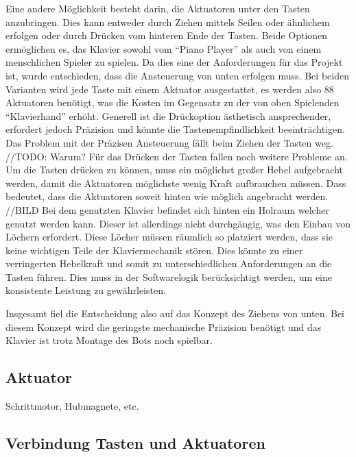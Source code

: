 Eine andere Möglichkeit besteht darin, die Aktuatoren unter den Tasten anzubringen. Dies kann entweder durch Ziehen mittels
Seilen oder ähnlichem erfolgen oder durch Drücken vom hinteren Ende der Tasten. Beide Optionen ermöglichen es, das Klavier sowohl vom
``Piano Player'' als auch von einem menschlichen Spieler zu spielen. Da dies eine der Anforderungen für das Projekt ist,
wurde entschieden, dass die Ansteuerung von unten erfolgen muss. Bei beiden Varianten wird jede Taste mit einem Aktuator
ausgestattet, es werden also 88 Aktuatoren benötigt, was die Kosten im Gegensatz zu der von oben Spielenden ``Klavierhand''
erhöht.
Generell ist die Drückoption ästhetisch ansprechender, erfordert jedoch Präzision und könnte die
Tastenempfindlichkeit beeinträchtigen. Das Problem mit der Präzisen Ansteuerung fällt beim Ziehen der Tasten weg.\newline
//TODO: Warum?
Für das Drücken der Tasten fallen noch weitere Probleme an. Um die Tasten drücken zu können, muss ein möglichst großer
Hebel aufgebracht werden, damit die Aktuatoren möglichste wenig Kraft aufbrauchen müssen. Dass bedeutet, dass
die Aktuatoren soweit hinten wie möglich angebracht werden.\newline
//BILD\newline
Bei dem genutzten Klavier befindet sich hinten ein Holraum welcher genutzt werden kann. Dieser ist allerdings
nicht durchgängig, was den
Einbau von Löchern erfordert. Diese Löcher müssen räumlich so platziert werden, dass sie keine wichtigen Teile der
Klaviermechanik stören. Dies könnte zu einer verringerten Hebelkraft und somit zu unterschiedlichen Anforderungen an
die Tasten führen. Dies muss in der Softwarelogik berücksichtigt werden, um eine konsistente Leistung zu gewährleisten.

Insgesamt fiel die Entscheidung also auf das Konzept des Ziehens von unten.
Bei diesem Konzept wird die geringste mechanische Präzision benötigt und das Klavier ist trotz Montage des Bots noch
spielbar.

\subsection{Aktuator}\label{subsec:aktuator}

Schrittmotor, Hubmagnete, etc.

\subsection{Verbindung Tasten und Aktuatoren}

